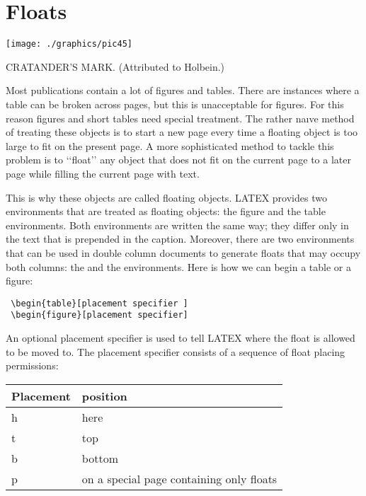 \chapter{Floats}

\begin{marginfigure}%
  \texttt{[image: ./graphics/pic45]}
  \caption{CRATANDER’S MARK. \hspace{2cm} (Attributed to Holbein.)}
  \label{fig:marginfig1}
\end{marginfigure}

Most publications contain a lot of figures and tables. There are instances where
a table can be broken across pages, but this is unacceptable for figures. For this reason
figures and short tables need special treatment. The rather naıve method of treating these
objects is to start a new page every time a floating object is too large to fit on the present
page. A more sophisticated method to tackle this problem is to ‘‘float’’ any object that
does not fit on the current page to a later page while filling the current page with text.

This is why these objects are called floating objects. LATEX provides two environments
that are treated as floating objects: the figure and the table environments. Both environments
are written the same way; they differ only in the text that is prepended in the
caption. Moreover, there are two environments that can be used in double column documents
to generate floats that may occupy both columns: the  and the 
environments. Here is how we can begin a table or a figure:

\begin{Verbatim}
 \begin{table}[placement specifier ]
 \begin{figure}[placement specifier]
\end{Verbatim}

An optional placement specifier is used to tell LATEX where the float is allowed to be
moved to. The placement specifier consists of a sequence of float placing permissions:

\begin{table}[htbp]
\begin{tabular}{ll}
\toprule
Placement   & position\\
\midrule
h                 & here\\
t                  & top\\
b                 & bottom\\
p                 & on a special page containing only floats\\
\bottomrule
\end{tabular}
\end{table}


